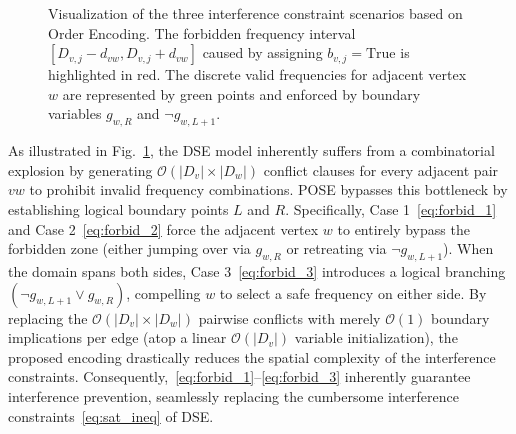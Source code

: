 \documentclass[letterpaper,journal]{IEEEtran}
\begin{document}
\begin{figure}[!t]
{%
}
\caption{Visualization of the three interference constraint scenarios based on Order Encoding. The forbidden frequency interval $[D_{v,j} - d_{vw}, D_{v,j} + d_{vw}]$ caused by assigning $b_{v,j} = \text{True}$ is highlighted in red. The discrete valid frequencies for adjacent vertex $w$ are represented by green points and enforced by boundary variables $g_{w,R}$ and $\neg g_{w,L+1}$.}
\label{fig:domain_pruning_cases}
\end{figure}

As illustrated in Fig.~\ref{fig:domain_pruning_cases}, the DSE model inherently suffers from a combinatorial explosion by generating $\mathcal{O}(|D_v| \times |D_w|)$ conflict clauses for every adjacent pair $vw$ to prohibit invalid frequency combinations. POSE bypasses this bottleneck by establishing logical boundary points $L$ and $R$. Specifically, Case 1~\eqref{eq:forbid_1} and Case 2~\eqref{eq:forbid_2} force the adjacent vertex $w$ to entirely bypass the forbidden zone (either jumping over via $g_{w,R}$ or retreating via $\neg g_{w,L+1}$). When the domain spans both sides, Case 3~\eqref{eq:forbid_3} introduces a logical branching $(\neg g_{w,L+1} \lor g_{w,R})$, compelling $w$ to select a safe frequency on either side. By replacing the $\mathcal{O}(|D_v| \times |D_w|)$ pairwise conflicts with merely $\mathcal{O}(1)$ boundary implications per edge (atop a linear $\mathcal{O}(|D_v|)$ variable initialization), the proposed encoding drastically reduces the spatial complexity of the interference constraints. Consequently,~\eqref{eq:forbid_1}--\eqref{eq:forbid_3} inherently guarantee interference prevention, seamlessly replacing the cumbersome interference constraints~\eqref{eq:sat_ineq} of DSE.
\end{document}
